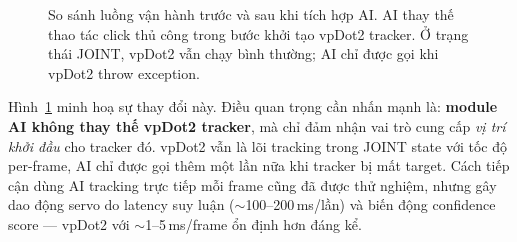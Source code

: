 \begin{figure}[htbp]
  \caption{So sánh luồng vận hành trước và sau khi tích hợp AI.
           AI thay thế thao tác click thủ công trong bước khởi tạo
           vpDot2 tracker. Ở trạng thái JOINT, vpDot2 vẫn chạy bình
           thường; AI chỉ được gọi khi vpDot2 throw exception.}
  \label{fig:ai3-before-after}
\end{figure}

Hình~\ref{fig:ai3-before-after} minh hoạ sự thay đổi này. Điều quan
trọng cần nhấn mạnh là: \textbf{module AI không thay thế vpDot2
tracker}, mà chỉ đảm nhận vai trò cung cấp \textit{vị trí khởi
đầu} cho tracker đó. vpDot2 vẫn là lõi tracking trong JOINT state
với tốc độ per-frame, AI chỉ được gọi thêm một lần nữa khi
tracker bị mất target. Cách tiếp cận dùng AI tracking trực tiếp
mỗi frame cũng đã được thử nghiệm, nhưng gây dao động servo do
latency suy luận ($\sim$100--200\,ms/lần) và biến động confidence
score --- vpDot2 với $\sim$1--5\,ms/frame ổn định hơn đáng kể.


